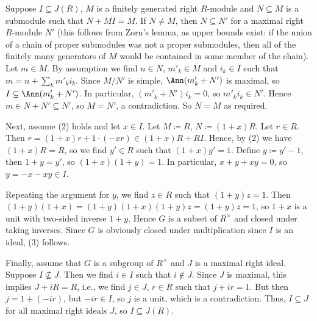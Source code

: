 Suppose $I \subseteq J(R)$, $M$ is a finitely generated right $R$-module and
$N \subseteq M$ is a submodule such that $N + MI = M$. If $N \neq M$, then
$N \subseteq N'$ for a maximal right $R$-module $N'$ (this follows from Zorn's lemma,
as upper bounds exist: if the union of a chain
of proper submodules was not a proper submodules, then all of the finitely many generators
of $M$ would be contained in some member of the chain). Let $m \in M$. By assumption
we find $n \in N$, $m'_k \in M$ and $i_k \in I$ such that $m = n + \sum_k m'_ki_k$. Since
$M/N'$ is simple, $\Ann(m'_k + N')$ is maximal, so $I \subseteq \Ann(m'_k + N')$. In
particular, $(m'_k + N')i_k = 0$, so $m'_ki_k \in N'$. Hence $m \in N + N' \subseteq N'$,
so $M = N'$, a contradiction. So $N = M$ as required.

Next, assume (2) holds and let $x \in I$. Let $M \coloneqq R$, $N \coloneqq (1+x)R$.
Let $r \in R$. Then $r = (1+x)r + 1\cdot (-xr) \in (1+x)R + RI$. Hence, by (2)
we have $(1+x)R=R$, so we find $y' \in R$ such that $(1+x)y'=1$. Define
$y\coloneqq y' - 1$, then $1+y = y'$, so  $(1+x)(1+y) = 1$. In particular,
$x + y + xy = 0$, so $y = -x-xy \in I$.

Repeating the argument for $y$, we find  $z \in R$ such that $(1+y)z = 1$. Then
$(1+y)(1+x) = (1+y)(1+x)(1+y)z = (1+y)z = 1$, so $1+x$ is a unit with two-sided
inverse $1+y$. Hence $G$ is a subset of $R^\times$ and closed under taking inverses.
Since $G$ is obviously closed under multiplication since $I$ is an ideal, (3)
follows.

Finally, assume that $G$ is a subgroup of $R^\times$ and $J$ is a maximal right
ideal. Suppose $I\nsubseteq J$. Then we find $i \in I$ such that $i\notin J$.
Since $J$ is maximal, this implies $J + iR =R$, i.e., we find $j \in J$, $r \in R$
such that $j + ir = 1$. But then $j = 1 + (-ir)$, but $-ir \in I$, so $j$ is a
unit, which is a contradiction. Thus, $I \subseteq J$ for all maximal right ideals
$J$, so $I \subseteq J(R)$.
